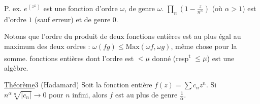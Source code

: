 P. ex.  $e^{(z^\omega)}$ est une fonction d'ordre $\omega$, de
genre $\omega$. $\prod_n\left(1-\frac{z}{n^\alpha}\right)$ (où $\alpha>1$) est d'ordre
$1$ (sauf erreur) et de genre $0$.

Notons que l'ordre du produit de deux
fonctions entières est au plus égal au maximum
des deux ordres : $\omega(fg)\leq\mathrm{Max}(\omega f,\omega g)$, même
chose pour la somme. 
fonctions entières dont l'ordre est $<\mu$ donné
(resp\textsuperscript{t} $\leq\mu$) est une  algèbre.

\uline{Théorème}3 (Hadamard) Soit la fonction entière
$f(z)=\sum c_n z^n$. Si $n^\alpha\sqrt[n]{|c_n|}\longrightarrow0$ pour
$n$ infini, alors $f$ est au plus de genre $\frac1\alpha$.
